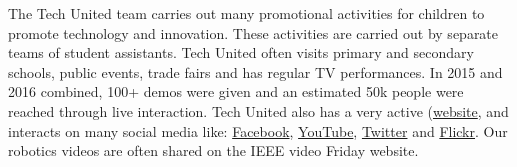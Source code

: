 The Tech United team carries out many promotional activities for children to promote technology and innovation. These activities are carried out by separate teams of student assistants. Tech United often visits primary and secondary schools, public events, trade fairs and has regular TV performances. In 2015 and 2016 combined, 100+ demos were given and an estimated 50k people were reached through live interaction.
Tech United also has a very active (\href{www.techunited.nl}{website}, and interacts on many social media like: \href{https://www.facebook.com/techunited}{Facebook}, \href{https://www.youtube.com/user/TechUnited}{YouTube}, \href{https://twitter.com/TechUnited}{Twitter} and \href{https://www.flickr.com/photos/techunited/}{Flickr}. Our robotics videos are often shared on the IEEE video Friday website.